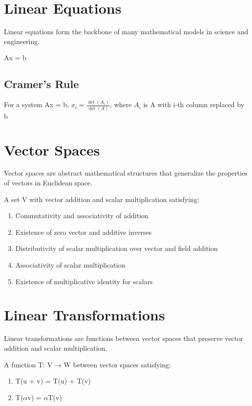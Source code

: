 \documentclass[12pt,a4paper]{article}
\begin{document}
\section{Linear Equations}
\begin{info-box}
Linear equations form the backbone of many mathematical models in science and engineering.
\end{info-box}

Ax = b

\subsection{Cramer's Rule}
For a system Ax = b, $x_i = \frac{\det(A_i)}{\det(A)}$, where $A_i$ is A with i-th column replaced by b

\section{Vector Spaces}
\begin{info-box}
Vector spaces are abstract mathematical structures that generalize the properties of vectors in Euclidean space.
\end{info-box}

A set V with vector addition and scalar multiplication satisfying:
\begin{enumerate}
\item Commutativity and associativity of addition
\item Existence of zero vector and additive inverses
\item Distributivity of scalar multiplication over vector and field addition
\item Associativity of scalar multiplication
\item Existence of multiplicative identity for scalars
\end{enumerate}

\section{Linear Transformations}
\begin{info-box}
Linear transformations are functions between vector spaces that preserve vector addition and scalar multiplication.
\end{info-box}

A function T: V → W between vector spaces satisfying:
\begin{enumerate}
\item T(u + v) = T(u) + T(v)
\item T($\alpha$v) = $\alpha$T(v)
\end{enumerate}
\end{document}
